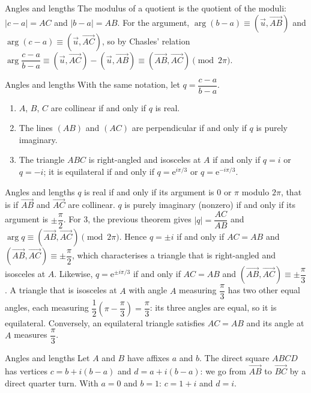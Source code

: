 \documentclass[aspectratio=169,10pt]{beamer}
\providecommand{\vect}[1]{\overrightarrow{#1}}
\providecommand{\abs}[1]{\left\lvert #1\right\rvert}
\providecommand{\e}{\mathrm{e}}
\begin{document}
\begin{frame}{Angles and lengths}
The modulus of a quotient is the quotient of the moduli: \(\abs{c-a}=AC\) and \(\abs{b-a}=AB\). For the argument, \(\arg(b-a)\equiv\left(\vect u,\vect{AB}\right)\) and \(\arg(c-a)\equiv\left(\vect u,\vect{AC}\right)\), so by Chasles' relation \(\arg\dfrac{c-a}{b-a}\equiv\left(\vect u,\vect{AC}\right)-\left(\vect u,\vect{AB}\right)\equiv\left(\vect{AB},\vect{AC}\right)\pmod{2\pi}\).
\end{frame}
\begin{frame}{Angles and lengths}
With the same notation, let \(q=\dfrac{c-a}{b-a}\).

\begin{enumerate}
\setcounter{enumi}{0}
\item \(A\), \(B\), \(C\) are collinear if and only if \(q\) is real.

\item The lines \((AB)\) and \((AC)\) are perpendicular if and only if \(q\) is purely imaginary.

\item The triangle \(ABC\) is right-angled and isosceles at \(A\) if and only if \(q=i\) or \(q=-i\); it is equilateral if and only if \(q=\e^{i\pi/3}\) or \(q=\e^{-i\pi/3}\).

\end{enumerate}
\end{frame}
\begin{frame}{Angles and lengths}
\(q\) is real if and only if its argument is \(0\) or \(\pi\) modulo \(2\pi\), that is if \(\vect{AB}\) and \(\vect{AC}\) are collinear. \(q\) is purely imaginary (nonzero) if and only if its argument is \(\pm\dfrac\pi2\). For 3, the previous theorem gives \(\abs q=\dfrac{AC}{AB}\) and \(\arg q\equiv\left(\vect{AB},\vect{AC}\right)\pmod{2\pi}\). Hence \(q=\pm i\) if and only if \(AC=AB\) and \(\left(\vect{AB},\vect{AC}\right)\equiv\pm\dfrac\pi2\), which characterises a triangle that is right-angled and isosceles at \(A\). Likewise, \(q=\e^{\pm i\pi/3}\) if and only if \(AC=AB\) and \(\left(\vect{AB},\vect{AC}\right)\equiv\pm\dfrac\pi3\). A triangle that is isosceles at \(A\) with angle \(A\) measuring \(\dfrac\pi3\) has two other equal angles, each measuring \(\dfrac12\left(\pi-\dfrac\pi3\right)=\dfrac\pi3\): its three angles are equal, so it is equilateral. Conversely, an equilateral triangle satisfies \(AC=AB\) and its angle at \(A\) measures \(\dfrac\pi3\).
\end{frame}
\begin{frame}{Angles and lengths}
Let \(A\) and \(B\) have affixes \(a\) and \(b\). The direct square \(ABCD\) has vertices \(c=b+i(b-a)\) and \(d=a+i(b-a)\): we go from \(\vect{AB}\) to \(\vect{BC}\) by a direct quarter turn. With \(a=0\) and \(b=1\): \(c=1+i\) and \(d=i\).
\end{frame}
\end{document}
